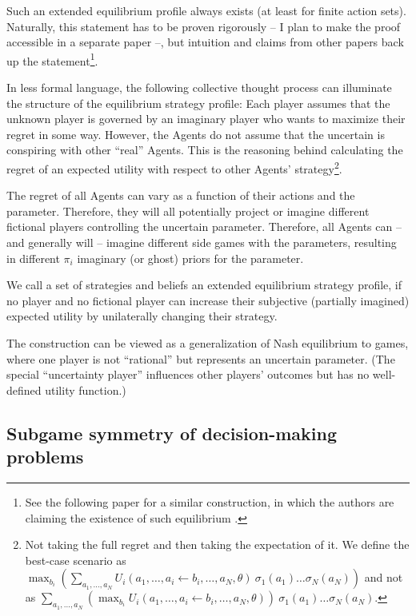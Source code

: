 \documentclass{article}
\begin{document}
Such an extended equilibrium profile always exists (at least for finite action sets). Naturally, this statement has to be proven rigorously -- I plan to make the proof accessible in a separate paper --, but intuition and claims from other papers back up the statement\footnote{See the following paper for a similar construction, in which the authors are claiming the existence of such equilibrium \cite{arxiv:RegretMinimizingEquilibria}.}.


In less formal language, the following collective thought process can illuminate the structure of the equilibrium strategy profile:
Each player assumes that the unknown player is governed by an imaginary player who wants to maximize their regret in some way. However, the Agents do not assume that the uncertain is conspiring with other ``real'' Agents. This is the reasoning behind calculating the regret of an expected utility with respect to other Agents' strategy\footnote{Not taking the full regret and then taking the expectation of it. We define the best-case scenario as $\max_{b_i} 
\left (
\sum_{a_1,\dots,a_N} U_i(a_1,\dots,a_i \leftarrow b_i,\dots,a_N,\theta) \ 
\sigma_1(a_1) \dots \sigma_N(a_N)
\right )$
and not as
$ \sum_{a_1,\dots,a_N} \left ( \max_{b_i} U_i(a_1,\dots,a_i \leftarrow b_i,\dots,a_N,\theta) \right ) \ 
\sigma_1(a_1) \dots \sigma_N(a_N)
$.
}.

The regret of all Agents can vary as a function of their actions and the parameter. Therefore, they will all potentially project or imagine different fictional players controlling the uncertain parameter.
Therefore, all Agents can -- and generally will -- imagine different side games with the parameters, resulting in different $\pi_i$ imaginary (or ghost) priors for the parameter.

We call a set of strategies and beliefs an extended equilibrium strategy profile, if no player and no fictional player can increase their subjective (partially imagined) expected utility by unilaterally changing their strategy.

The construction can be viewed as a generalization of Nash equilibrium to games, where one player is not ``rational'' but represents an uncertain parameter. (The special ``uncertainty player'' influences other players' outcomes but has no well-defined utility function.)

\subsection*{Subgame symmetry of decision-making problems}
\end{document}

